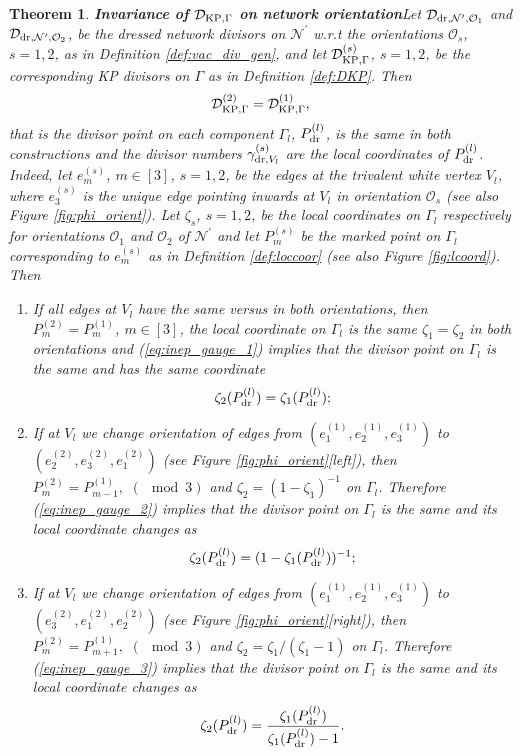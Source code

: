 \documentclass[11pt]{amsart}
\theoremstyle{plain}
\numberwithin{equation}{section}
\newtheorem{theorem}{Theorem}[subsection]
\def \DKP {{\mathcal D}_{\textup{\scriptsize KP},\Gamma}}
\def \gdr {\gamma_{\textup{\scriptsize dr},V_l}}
\begin{document}
\begin{theorem}\textbf{Invariance of $\DKP$ on network orientation}\label{theo:inv}
Let ${\mathcal D}_{\textup{\scriptsize dr}, {\mathcal N}^{\prime}, \mathcal O_1}$ and ${\mathcal D}_{\textup{\scriptsize dr}, {\mathcal N}^{\prime}, \mathcal O_2}$, be the dressed network divisors on $\mathcal N^{\prime}$ w.r.t the orientations $\mathcal O_s$, $s=1,2$, as in Definition \ref{def:vac_div_gen}, and let $\DKP^{(s)}$, $s=1,2$, be the corresponding KP divisors on $\Gamma$ as in Definition \ref{def:DKP}. Then 
\[
\DKP^{(2)} = \DKP^{(1)},
\] 
that is the divisor point on each component $\Gamma_l$,  $P_{\textup{\scriptsize dr}}^{(l)}$, is the same in both constructions
and the divisor numbers $\gdr^{(s)}$ are the local coordinates of $P_{\textup{\scriptsize dr}}^{(l)}$. Indeed, let $e^{(s)}_m$, $m\in [3]$, $s=1,2$, be the edges at the trivalent white vertex $V_l$, where $e^{(s)}_3$ is the unique edge pointing inwards at $V_l$ in orientation $\mathcal O_s$ (see also Figure \ref{fig:phi_orient}).
Let $\zeta_s$, $s=1,2$, be the local coordinates on $\Gamma_l$ respectively for orientations $\mathcal O_1$ and $\mathcal O_2$ of ${\mathcal N}^{\prime}$ and let $P^{(s)}_m$ be the marked point on $\Gamma_l$ corresponding to $e^{(s)}_m$ as in Definition
\ref{def:loccoor} (see also Figure \ref{fig:lcoord}).
Then 
\begin{enumerate}
\item If all edges at $V_l$ have the same versus in both orientations, then $P^{(2)}_m=P^{(1)}_m$, $m\in [3]$, the local coordinate on $\Gamma_l$ is the same $\zeta_1=\zeta_2$ in both orientations and (\ref{eq:inep_gauge_1}) implies that the divisor point on $\Gamma_l$ is the same and has the same coordinate
\[
\zeta_2(P_{\textup{\scriptsize dr}}^{(l)})=\zeta_1(P_{\textup{\scriptsize dr}}^{(l)});
\]
\item If at $V_l$ we change orientation of edges from $(e_1^{(1)},e_2^{(1)},e_3^{(1)})$ to $(e_2^{(2)},e_3^{(2)},e_1^{(2)})$ (see Figure \ref{fig:phi_orient}[left]), then $P^{(2)}_m=P^{(1)}_{m-1}, \,\,
(\!\!\!\!\mod 3)$ and $\zeta_2 = (1-\zeta_1)^{-1}$ on $\Gamma_l$. Therefore (\ref{eq:inep_gauge_2}) implies that the divisor point on $\Gamma_l$ is the same and its local coordinate changes as  
\[
\zeta_2(P_{\textup{\scriptsize dr}}^{(l)})=(1-\zeta_1(P_{\textup{\scriptsize dr}}^{(l)}))^{-1};
\] 
\item If at $V_l$ we change orientation of edges from $(e_1^{(1)},e_2^{(1)},e_3^{(1)})$ to $(e_3^{(2)},e_1^{(2)},e_2^{(2)})$ (see Figure \ref{fig:phi_orient}[right]), then $P^{(2)}_m=P^{(1)}_{m+1}, \,\, (\!\!\!\!\mod 3)$ and $\zeta_2 = \zeta_1/(\zeta_1-1)$ on $\Gamma_l$. Therefore (\ref{eq:inep_gauge_3}) implies that the divisor point on $\Gamma_l$ is the same and its local coordinate changes as
\[  
\zeta_2(P_{\textup{\scriptsize dr}}^{(l)}) = \frac{\zeta_1(P_{\textup{\scriptsize dr}}^{(l)})}{\zeta_1(P_{\textup{\scriptsize dr}}^{(l)})-1}.
\]
\end{enumerate}
\end{theorem} 
\end{document}
